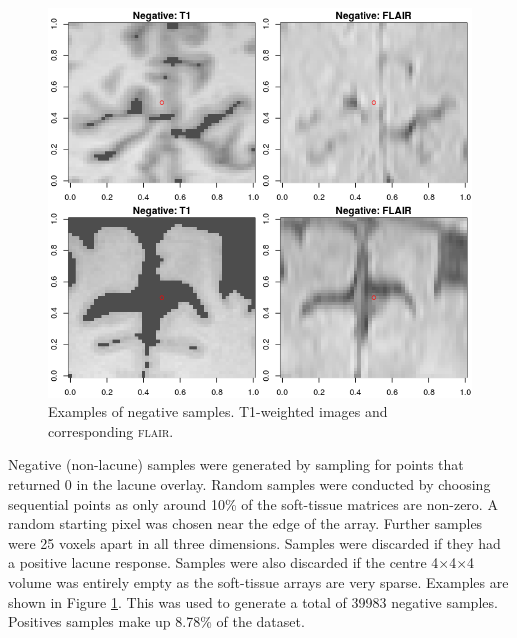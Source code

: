 \begin{figure}[ht]
\centering
\includegraphics[width=\linewidth]{Images/6_negatives.png}
\caption{Examples of negative samples. T1-weighted images and corresponding \textsc{flair}.}
\label{data-negatives}
\end{figure}

Negative (non-lacune) samples were generated by sampling for points that returned 0 in the lacune overlay. Random samples were conducted by choosing sequential points as only around 10\% of the soft-tissue matrices are non-zero. A random starting pixel was chosen near the edge of the array. Further samples were 25 voxels apart in all three dimensions. Samples were discarded if they had a positive lacune response. Samples were also discarded if the centre 4$\times$4$\times$4 volume was entirely empty as the soft-tissue arrays are very sparse. Examples are shown in Figure \ref{data-negatives}. This was used to generate a total of 39983 negative samples. Positives samples make up 8.78\% of the dataset.

%
%
%
%


